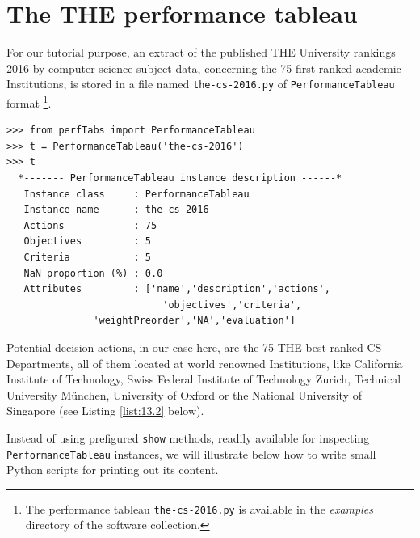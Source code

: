 \section{The THE performance tableau}
\label{sec:13.1}

For our tutorial purpose, an extract of the published THE University rankings 2016 by computer science subject data, concerning the 75 first-ranked academic Institutions, is stored in a file named \texttt{the-cs-2016.py} of \texttt{PerformanceTableau} format \footnote{The performance tableau \texttt{the-cs-2016.py} is available in the \emph{examples} directory of the \Digraph software collection.}.

\begin{lstlisting}[caption={The 2016 THE World University Ranking by CS subject},label=list:13.1]
>>> from perfTabs import PerformanceTableau
>>> t = PerformanceTableau('the-cs-2016')
>>> t
  *------- PerformanceTableau instance description ------*
   Instance class     : PerformanceTableau
   Instance name      : the-cs-2016
   Actions            : 75
   Objectives         : 5
   Criteria           : 5
   NaN proportion (%) : 0.0
   Attributes         : ['name','description','actions',
                           'objectives','criteria',
			   'weightPreorder','NA','evaluation']
\end{lstlisting}

Potential decision actions, in our case here, are the 75 THE best-ranked CS Departments, all of them located at world renowned Institutions, like California Institute of Technology, Swiss Federal Institute of Technology Zurich, Technical University München, University of Oxford or the National University of Singapore (see Listing \ref{list:13.2} below). 

Instead of using prefigured \Digraph \texttt{show} methods, readily available for inspecting \texttt{PerformanceTableau} instances, we will illustrate below how to write small Python scripts for printing out its content.   

